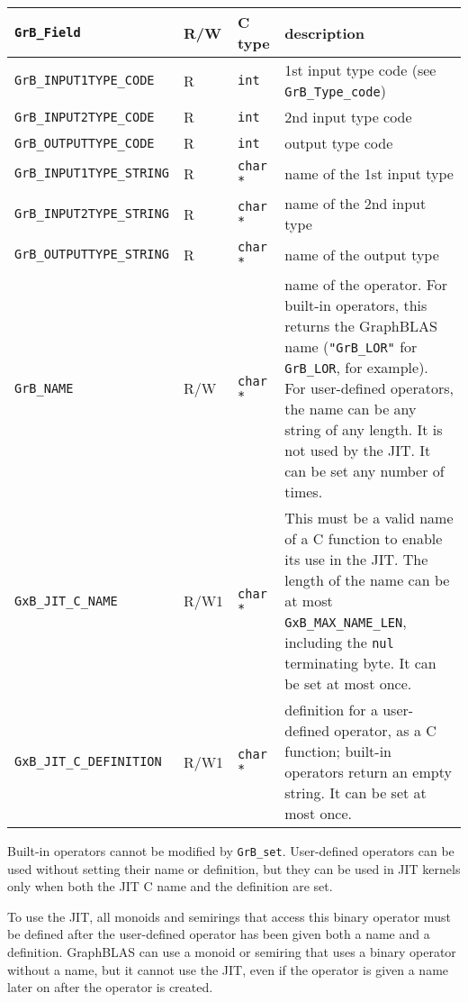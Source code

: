 \noindent
{\small
\begin{tabular}{|l|l|l|p{2.8in}|}
\hline
\verb'GrB_Field'                    & R/W  & C type        & description \\
\hline
\verb'GrB_INPUT1TYPE_CODE'          & R    & \verb'int'    & 1st input type code (see \verb'GrB_Type_code') \\
\verb'GrB_INPUT2TYPE_CODE'          & R    & \verb'int'    & 2nd input type code \\
\verb'GrB_OUTPUTTYPE_CODE'          & R    & \verb'int'    & output type code \\
\verb'GrB_INPUT1TYPE_STRING'        & R    & \verb'char *' & name of the 1st input type \\
\verb'GrB_INPUT2TYPE_STRING'        & R    & \verb'char *' & name of the 2nd input type \\
\verb'GrB_OUTPUTTYPE_STRING'        & R    & \verb'char *' & name of the output type \\
\hline
\verb'GrB_NAME'                     & R/W  & \verb'char *' &
    name of the operator.  For built-in operators, this returns the GraphBLAS
    name (\verb'"GrB_LOR"' for \verb'GrB_LOR', for example).
    For user-defined operators, the name can be any string of any length.  It
    is not used by the JIT.  It can be set any number of times. \\
\verb'GxB_JIT_C_NAME'               & R/W1 & \verb'char *' &
    This must be a valid name of a C function to enable its use in the JIT.
    The length of the name can be at most \verb'GxB_MAX_NAME_LEN', including
    the \verb'nul' terminating byte.  It can be set at most once. \\
\verb'GxB_JIT_C_DEFINITION'         & R/W1 & \verb'char *' &
    definition for a user-defined operator, as a C function; built-in operators
    return an empty string.  It can be set at most once. \\
\hline
\end{tabular}
}

Built-in operators cannot be modified by \verb'GrB_set'.  User-defined
operators can be used without setting their name or definition, but they can be
used in JIT kernels only when both the JIT C name and the definition are set.

To use the JIT, all monoids and semirings that access this binary operator must
be defined after the user-defined operator has been given both a name and a
definition.  GraphBLAS can use a monoid or semiring that uses a binary operator
without a name, but it cannot use the JIT, even if the operator is given a name
later on after the operator is created.


